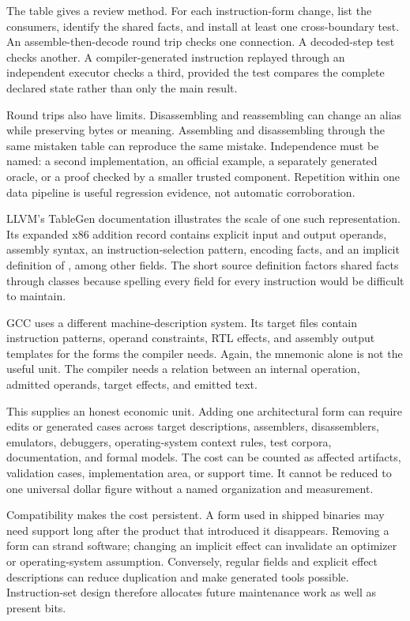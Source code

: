 The table gives a review method. For each instruction-form change, list the
consumers, identify the shared facts, and install at least one cross-boundary
test. An assemble-then-decode round trip checks one connection. A decoded-step
test checks another. A compiler-generated instruction replayed through an
independent executor checks a third, provided the test compares the complete
declared state rather than only the main result.

Round trips also have limits. Disassembling and reassembling can change an
alias while preserving bytes or meaning. Assembling and disassembling through
the same mistaken table can reproduce the same mistake. Independence must be
named: a second implementation, an official example, a separately generated
oracle, or a proof checked by a smaller trusted component. Repetition within
one data pipeline is useful regression evidence, not automatic corroboration.

LLVM's TableGen documentation illustrates the scale of one such
representation. Its expanded x86 addition record contains explicit input and
output operands, assembly syntax, an instruction-selection pattern, encoding
facts, and an implicit definition of , among other fields. The
short source definition factors shared facts through classes because spelling
every field for every instruction would be difficult to maintain.
\autocite{llvm2026tablegen}

GCC uses a different machine-description system. Its target files contain
instruction patterns, operand constraints, RTL effects, and assembly output
templates for the forms the compiler needs. Again, the mnemonic alone is not
the useful unit. The compiler needs a relation between an internal operation,
admitted operands, target effects, and emitted text. \autocite{gcc2026machinedesc}

This supplies an honest economic unit. Adding one architectural form can
require edits or generated cases across target descriptions, assemblers,
disassemblers, emulators, debuggers, operating-system context rules, test
corpora, documentation, and formal models. The cost can be counted as affected
artifacts, validation cases, implementation area, or support time. It cannot
be reduced to one universal dollar figure without a named organization and
measurement.

Compatibility makes the cost persistent. A form used in shipped binaries may
need support long after the product that introduced it disappears. Removing a
form can strand software; changing an implicit effect can invalidate an
optimizer or operating-system assumption. Conversely, regular fields and
explicit effect descriptions can reduce duplication and make generated tools
possible. Instruction-set design therefore allocates future maintenance work
as well as present bits.

